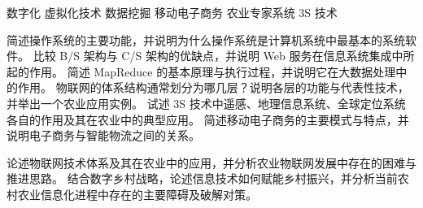 \documentclass[a4paper,11pt]{article}
\begin{document}

\q 数字化\anslines{2.0cm}
\q 虚拟化技术\anslines{2.0cm}
\q 数据挖掘\anslines{2.0cm}
\q 移动电子商务\anslines{2.0cm}
\q 农业专家系统\anslines{2.0cm}
\q 3S 技术\anslines{2.0cm}
\newpage

\q 简述操作系统的主要功能，并说明为什么操作系统是计算机系统中最基本的系统软件。\anslines{3.2cm}
\q 比较 B/S 架构与 C/S 架构的优缺点，并说明 Web 服务在信息系统集成中所起的作用。\anslines{3.2cm}
\q 简述 MapReduce 的基本原理与执行过程，并说明它在大数据处理中的作用。\anslines{3.2cm}
\newpage
\q 物联网的体系结构通常划分为哪几层？说明各层的功能与代表性技术，并举出一个农业应用实例。\anslines{3.2cm}
\q 试述 3S 技术中遥感、地理信息系统、全球定位系统各自的作用及其在农业中的典型应用。\anslines{3.2cm}
\q 简述移动电子商务的主要模式与特点，并说明电子商务与智能物流之间的关系。\anslines{3.2cm}
\newpage

\q 论述物联网技术体系及其在农业中的应用，并分析农业物联网发展中存在的困难与推进思路。\anslines{11cm}
\newpage
\q 结合数字乡村战略，论述信息技术如何赋能乡村振兴，并分析当前农村农业信息化进程中存在的主要障碍及破解对策。\anslines{13cm}
\end{document}
